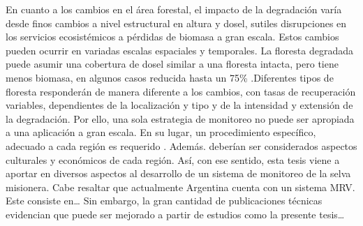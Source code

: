 En cuanto a los cambios en el área forestal, el impacto de la degradación varía desde finos cambios a nivel estructural en altura y dosel, sutiles disrupciones en los servicios ecosistémicos a pérdidas de biomasa a gran escala. Estos cambios pueden ocurrir en variadas escalas espaciales y temporales. La floresta degradada puede asumir una cobertura de dosel similar a una floresta intacta, pero tiene menos biomasa, en algunos casos reducida hasta un 75\% \cite{change_report_2006}.Diferentes tipos de floresta responderán de manera diferente a los cambios, con tasas de recuperación variables, dependientes de la localización y tipo y de la intensidad y extensión de la degradación. Por ello, una sola estrategia de monitoreo no puede ser apropiada a una aplicación a gran escala. En su lugar, un procedimiento específico, adecuado a cada región es requerido \cite{mitchell_current_2017}. Además. deberían ser considerados aspectos culturales y económicos de cada región. Así, con ese sentido, esta tesis viene a aportar en diversos aspectos al desarrollo de un sistema de monitoreo de la selva misionera.
Cabe resaltar que actualmente Argentina cuenta con un sistema MRV. Este consiste en…
Sin embargo, la gran cantidad de publicaciones técnicas evidencian que puede ser mejorado a partir de estudios como la presente tesis…


